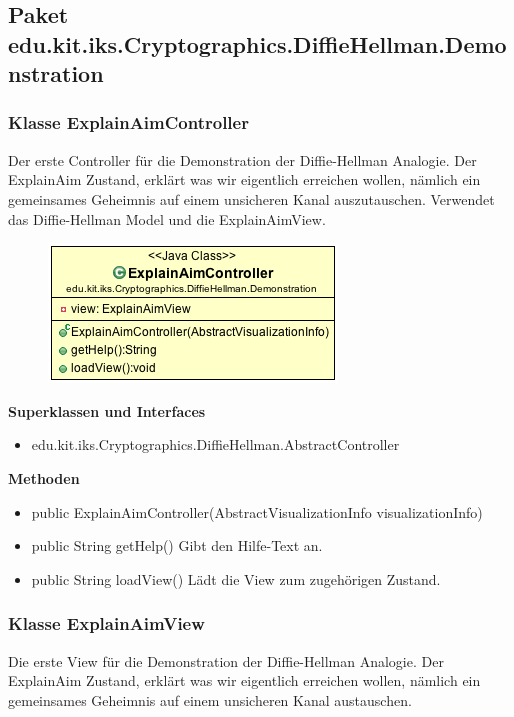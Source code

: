 \documentclass{article}
\begin{document}
\subsection{Paket edu.kit.iks.Cryptographics.DiffieHellman.Demonstration}

\subsubsection{Klasse ExplainAimController}
      Der erste Controller für die Demonstration der Diffie-Hellman Analogie.
      Der ExplainAim Zustand, erklärt was wir eigentlich erreichen wollen,
      nämlich ein gemeinsames Geheimnis auf einem unsicheren Kanal auszutauschen.
      Verwendet das Diffie-Hellman Model und die ExplainAimView.

      \begin{figure}[H]
        \centering
        \includegraphics{resources/edu-kit-iks-Cryptographics-DiffieHellman-Demonstration-ExplainAimController}
      \end{figure}

      \textbf{Superklassen und Interfaces}
      \begin{itemize}
        \item edu.kit.iks.Cryptographics.DiffieHellman.AbstractController
      \end{itemize}

      \textbf{Methoden}
      \begin{itemize}
        \item public ExplainAimController(AbstractVisualizationInfo visualizationInfo)
        \item public String getHelp() \newline
        Gibt den Hilfe-Text an.
        \item public String loadView() \newline
        Lädt die View zum zugehörigen Zustand.
      \end{itemize}

\subsubsection{Klasse ExplainAimView}
      Die erste View für die Demonstration der Diffie-Hellman Analogie.
      Der ExplainAim Zustand, erklärt was wir eigentlich erreichen wollen,
      nämlich ein gemeinsames Geheimnis auf einem unsicheren Kanal austauschen.
\end{document}
